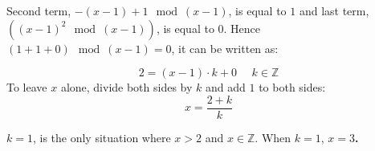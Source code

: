 \documentclass[11pt]{article}
\begin{document}
	Second term, $-(x-1) +1 \mod (x-1)$, is equal to $1$ and last term, $((x-1)^2\mod (x-1))$, is equal to $0$. Hence $(1 + 1 + 0) \mod (x-1) = 0$, it can be written as:
	
	\begin{equation*}
		2 = (x-1) \cdot k + 0\ \ \ \ \ \ \text{$k\in \mathbb{Z}$}
	\end{equation*}
	To leave $x$ alone, divide both sides by $k$ and add $1$ to both sides:
	\begin{equation*}
		x = \frac{2+k}{k}
	\end{equation*}
	
	$k=1$, is the only situation where $x > 2$ and $x \in \mathbb{Z}$. When $k=1$, \textbf{$x=3$.}
	
	
\end{document}
